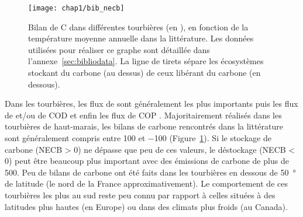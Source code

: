 \begin{figure}
\centering
\texttt{[image: chap1/bib\_necb]}
\caption{Bilan de C dans différentes tourbières (en \si{\gcma}), en fonction de la température moyenne annuelle dans la littérature. Les données utilisées pour réaliser ce graphe sont détaillée dans l'annexe~\ref{sec:bibliodata}. La ligne de tirets sépare les écosystèmes stockant du carbone (au dessus) de ceux libérant du carbone (en dessous).}
\label{fig:bib_necb}
\end{figure}


Dans les tourbières, les flux de \coo sont généralement les plus importants puis les flux de \chh et/ou de COD et enfin les flux de COP \citep{worrall2009,koehler2011}.
Majoritairement réalisés dans les tourbières de haut-marais, les bilans de carbone rencontrés dans la littérature sont généralement compris entre 100 et \SI{-100}{\gcma} (Figure~\ref{fig:bib_necb}).
Si le stockage de carbone (NECB > 0) ne dépasse que peu de ces valeurs, le déstockage (NECB < 0) peut être beaucoup plus important avec des émissions de carbone de plus de \SI{500}{\gcma}.
Peu de bilans de carbone ont été faits dans les tourbières en dessous de \SI{50}{\degree} de latitude (le nord de la France approximativement).
Le comportement de ces tourbières les plus au sud reste peu connu par rapport à celles situées à des latitudes plus hautes (en Europe) ou dans des climats plus froids (au Canada).

